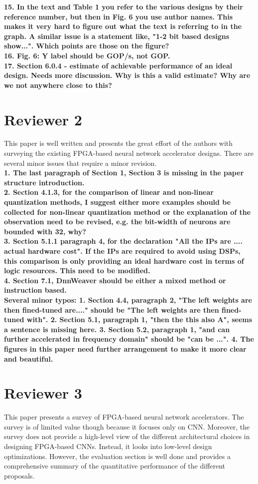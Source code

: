 \documentclass[12pt]{paper}
\newcommand{\reviewer}[1]{\section*{Reviewer #1}}
\newcommand{\comment}[1]{\noindent\textbf{#1}\\}
\begin{document}
\comment{15. In the text and Table 1 you refer to the various designs by their reference number, but then in Fig. 6 you use author names. This makes it very hard to figure out what the text is referring to in the graph. A similar issue is a statement like, "1-2 bit based designs show...".  Which points are those on the figure?}

\comment{16. Fig. 6: Y label should be GOP/s, not GOP.}

\comment{17. Section 6.0.4 - estimate of achievable performance of an ideal design.  Needs more discussion. Why is this a valid estimate? Why are we not anywhere close to this?}

\reviewer{2}

This paper is well written and presents the great effort of the authors with surveying the existing FPGA-based neural network accelerator designs. There are several minor issues that require a minor revision.\\

\comment{1.	The last paragraph of Section 1, Section 3 is missing in the paper structure introduction.}

\comment{2. Section 4.1.3, for the comparison of linear and non-linear quantization methods, I suggest either more examples should be collected for non-linear quantization method or the explanation of the observation need to be revised, e.g. the bit-width of neurons are bounded with 32, why?}

\comment{3.	Section 5.1.1 paragraph 4, for the declaration "All the IPs are .... actual hardware cost". If the IPs are required to avoid using DSPs, this comparison is only providing an ideal hardware cost in terms of logic resources. This need to be modified.}

\comment{4.	Section 7.1, DnnWeaver should be either a mixed method or instruction based.}

\comment{Several minor typos:
1. Section 4.4, paragraph 2, "The left weights are then fined-tuned are...." should be "The left weights are then fined-tuned with".
2. Section 5.1, paragraph 1, "then the this also A", seems a sentence is missing here.
3. Section 5.2, paragraph 1, "and can further accelerated in frequency domain" should be "can be ...".
4. The figures in this paper need further arrangement to make it more clear and beautiful.}

\reviewer{3}

This paper presents a survey of FPGA-based neural network accelerators. The survey is of limited value though because it focuses only on CNN. Moreover, the survey does not provide a high-level view of the different architectural choices in designing FPGA-based CNNs. Instead, it looks into low-level design optimizations. However, the evaluation section is well done and provides a comprehensive summary of the quantitative performance of the different proposals.\\
\end{document}

